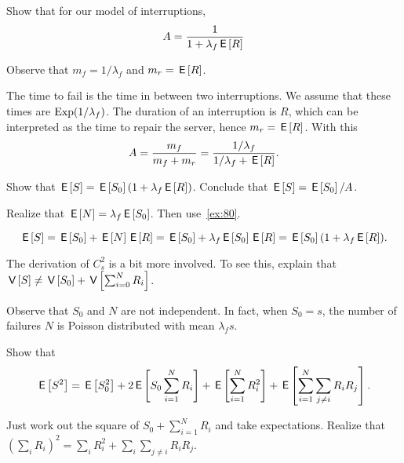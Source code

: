 \begin{extra}\label{ex:80}
  Show that  for our model of interruptions,
  \begin{equation*}
A=\frac 1{1+\lambda_f \,\mathsf{E}\left[R\right]}
  \end{equation*}
  \begin{hint}
    Observe that $m_f = 1/\lambda_f$ and $m_r = \,\mathsf{E}\left[R\right]$.
  \end{hint}
  \begin{solution}
The time to fail is the time in between two interruptions. We assume that these times are $\operatorname{Exp}(1/\lambda_f)$. The duration of an interruption is $R$, which can be interpreted as the time to repair the server, hence $m_r = \,\mathsf{E}\left[R\right]$. With this
\begin{equation*}
  A=\frac{m_f}{m_f + m_r}=\frac{1/\lambda_f }{1/\lambda_f + \,\mathsf{E}\left[R\right]}. 
\end{equation*}
  \end{solution}
\end{extra}


\begin{extra}
  Show that $\,\mathsf{E}\left[S\right] = \,\mathsf{E}\left[S_0\right] (1+\lambda_f \,\mathsf{E}\left[R\right])$.
  Conclude that $\,\mathsf{E}\left[S\right] = \,\mathsf{E}\left[S_0\right]/A$.
  \begin{hint}
    Realize that $\,\mathsf{E}\left[N\right] = \lambda_f \,\mathsf{E}\left[S_0\right]$. Then use~\cref{ex:80}.
  \end{hint}
  \begin{solution}
    \begin{equation*}
      \,\mathsf{E}\left[S\right] = \,\mathsf{E}\left[S_0\right] + \,\mathsf{E}\left[N\right] \,\mathsf{E}\left[R\right] = \,\mathsf{E}\left[S_0\right] +  \lambda_f \,\mathsf{E}\left[S_0\right] \,\mathsf{E}\left[R\right]= \,\mathsf{E}\left[S_0\right](1+\lambda_f \,\mathsf{E}\left[R\right]).
    \end{equation*}
  \end{solution}
\end{extra}


\begin{exercise}
  The derivation of $C_s^2$ is a bit more involved.
  To see this, explain that $\,\mathsf{V}\left[S\right] \neq \,\mathsf{V}\left[S_0\right] + \,\mathsf{V}\left[\sum_{i=0}^N R_i\right]$.
  \begin{solution}
    Observe that $S_0$ and $N$ are not independent. In fact, when $S_0=s$, the number of failures $N$ is Poisson distributed with mean $\lambda_f s$. 
  \end{solution}
\end{exercise}



\begin{extra}\label{ex:81}
Show that 
\begin{equation*}
  \,\mathsf{E}\left[S^2\right] = \,\mathsf{E}\left[S_0^2\right] + 2\,\mathsf{E}\left[S_0 \sum_{i=1}^N R_i\right] + \,\mathsf{E}\left[\sum_{i=1}^N R_i^2\right] + \,\mathsf{E}\left[\sum_{i=1}^N \sum_{j\neq i} R_i R_j\right].
\end{equation*}
\begin{solution}
  Just work out the square of $S_0+\sum_{i=1}^N R_i$ and take expectations. Realize that $(\sum_i R_i)^2 = \sum_i R_i^2 + \sum_i\sum_{j\neq i} R_i R_j$.  
\end{solution}
\end{extra}


